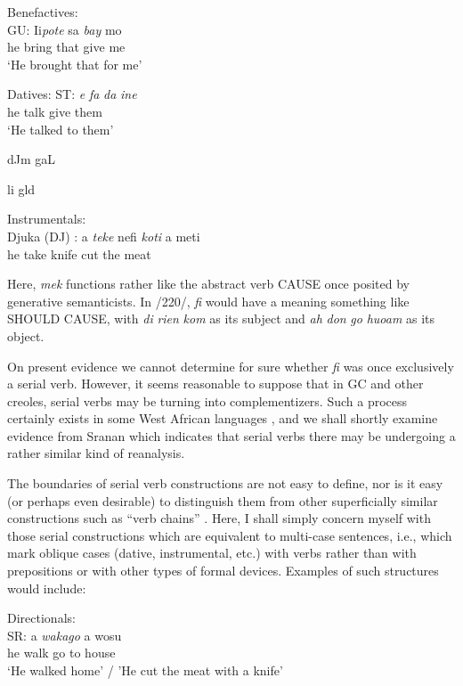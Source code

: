 \ea\label{ex:2:224}
 Benefactives:\\
\gll GU: Ii\textit{pote} sa \textit{bay} mo\\
he bring that give me\\
\glt `He brought that for me'
\z

\ea\label{ex:2:225}
 Datives:
\gll  ST: \textit{e} \textit{fa} \textit{da} \textit{ine} \\
he talk give them \\
\glt `He talked to them'
\z





dJm gaL

li gld

\ea\label{ex:2:226}
 Instrumentals:\\
\gll  Djuka (DJ) : a \textit{teke} nefi \textit{koti} a meti \\
he take knife cut the meat     \\
\z





Here, \textit{mek} functions rather like the abstract verb CAUSE once posited by generative semanticists. In /220/, \textit{fi} would have a meaning something
like SHOULD CAUSE, with \textit{di} \textit{rien} \textit{k}\textit{om} as its subject and \textit{ah} \textit{don} \textit{go} \textit{huoam} as its object.

On present evidence we cannot determine for sure whether \textit{fi}
was once exclusively a serial verb. However, it seems reasonable to suppose that in GC and other creoles, serial verbs may be turning into complementizers. Such a process certainly exists in some West African languages \citep{Lord1976}, and we shall shortly examine evidence from Sranan which indicates that serial verbs there may be undergoing a rather similar kind of reanalysis.

The boundaries of serial verb constructions are not easy to define, nor is it easy (or perhaps even desirable) to distinguish them from other superficially similar constructions such as ``verb chains'' \citep{Forman1972}. Here, I shall simply concern myself with those serial constructions which are equivalent to multi-case sentences, i.e., which mark oblique cases (dative, instrumental, etc.) with verbs rather than with prepositions or with other types of formal devices. Examples of such structures would include:

\ea\label{ex:2:223}
 Directionals:\\
\gll SR: a \textit{wak}\textit{a}\textit{go} a wosu\\
he walk go to house \\
\glt `He walked home' / 'He cut the meat with a knife'
\z


